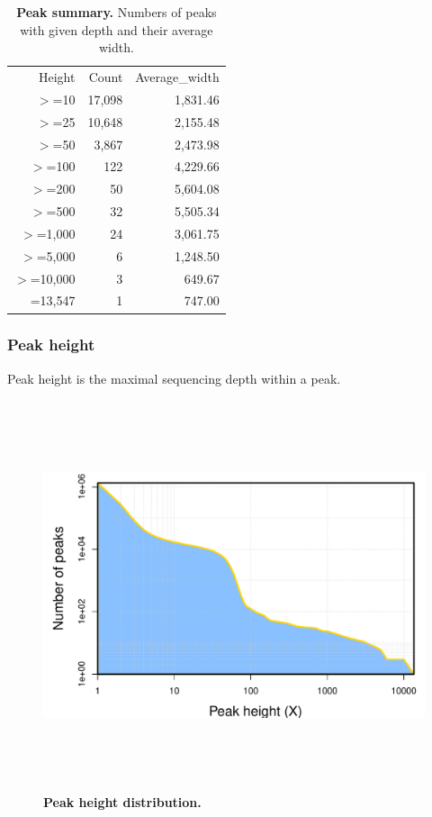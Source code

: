 \documentclass{article}
\begin{document}
\begin{table}
\begin{tabular}{|r|r|r|}
  \hline
Height & Count & Average\_width \\ 
  \rowcolor[gray]{0.9} \hline
$>$=10 & 17,098 & 1,831.46 \\ 
  $>$=25 & 10,648 & 2,155.48 \\ 
   \rowcolor[gray]{0.9}$>$=50 &  3,867 & 2,473.98 \\ 
  $>$=100 &    122 & 4,229.66 \\ 
   \rowcolor[gray]{0.9}$>$=200 &     50 & 5,604.08 \\ 
  $>$=500 &     32 & 5,505.34 \\ 
   \rowcolor[gray]{0.9}$>$=1,000 &     24 & 3,061.75 \\ 
  $>$=5,000 &      6 & 1,248.50 \\ 
   \rowcolor[gray]{0.9}$>$=10,000 &      3 &   649.67 \\ 
  =13,547 &      1 &   747.00 \\ 
   \hline
\end{tabular}\caption{\textbf{Peak summary.} Numbers of peaks with given depth and their average width.}
\end{table}

\subsubsection{Peak height}
Peak height is the maximal sequencing depth within a peak.
\begin{center}
\begin{figure}[H]
\includegraphics[width=7in, height=4.5in, page=1]{bamchop-chip-peak-height}
\caption{\textbf{Peak height distribution.}}
\end{figure}
\end{center}
\end{document}
